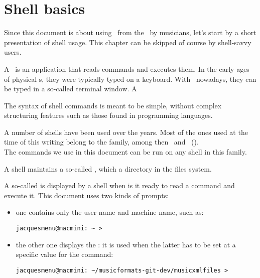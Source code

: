 



\chapter{Shell basics}

Since this document is about using \mf\ from the \CLI\ by musicians, let's start by a short presentation of shell usage. This chapter can be skipped of course by shell-savvy users.

A \shell\ is an application that reads commands and executes them. In the early ages of physical s, they were typically typed on a keyboard. With \GUI\ nowadays, they can be typed in a so-called terminal window.
A

The syntax of shell commands is meant to be simple, without complex structuring features such as those found in programming languages.

A number of shells have been used over the years. Most of the ones used at the time of this writing belong to the  family, among then \bash\ and \zsh\ (). \\
The commands we use in this document can be run on any shell in this family.

A shell maintains a so-called {\it \currentWorkingDirectory}, which a directory in the files system.

A so-called  is displayed by a shell when is it ready to read a command and execute it. This document uses two kinds of prompts:
\begin{itemize}
\item one contains only the user name and machine name, such as:
\begin{lstlisting}[language=Terminal]
jacquesmenu@macmini: ~ >
\end{lstlisting}

\item the other one displays the \currentWorkingDirectory: it is used when the latter has to be set at a specific value for the command:
\begin{lstlisting}[language=Terminal]
jacquesmenu@macmini: ~/musicformats-git-dev/musicxmlfiles >
\end{lstlisting}

\end{itemize}


